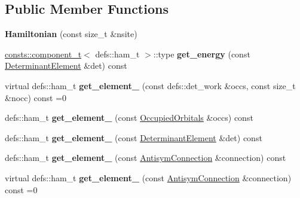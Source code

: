 \subsection*{Public Member Functions}
\begin{DoxyCompactItemize}
\item 
{\bfseries Hamiltonian} (const size\+\_\+t \&nsite)\hypertarget{classHamiltonian_aea9fe1aef1bf9bd4799a2b957c550f02}{}\label{classHamiltonian_aea9fe1aef1bf9bd4799a2b957c550f02}

\item 
\hyperlink{structconsts_1_1component__t}{consts\+::component\+\_\+t}$<$ defs\+::ham\+\_\+t $>$\+::type {\bfseries get\+\_\+energy} (const \hyperlink{classDeterminantElement}{Determinant\+Element} \&det) const \hypertarget{classHamiltonian_aed8eb6473b1540bdde9960a73393145e}{}\label{classHamiltonian_aed8eb6473b1540bdde9960a73393145e}

\item 
virtual defs\+::ham\+\_\+t {\bfseries get\+\_\+element\+\_} (const defs\+::det\+\_\+work \&occs, const size\+\_\+t \&nocc) const =0\hypertarget{classHamiltonian_a1042c841212b35ea08b0714942134dec}{}\label{classHamiltonian_a1042c841212b35ea08b0714942134dec}

\item 
defs\+::ham\+\_\+t {\bfseries get\+\_\+element\+\_} (const \hyperlink{structOccupiedOrbitals}{Occupied\+Orbitals} \&occs) const \hypertarget{classHamiltonian_a2e830dc13526070bc9b22033e11f100e}{}\label{classHamiltonian_a2e830dc13526070bc9b22033e11f100e}

\item 
defs\+::ham\+\_\+t {\bfseries get\+\_\+element\+\_} (const \hyperlink{classDeterminantElement}{Determinant\+Element} \&det) const \hypertarget{classHamiltonian_af24779f187d68cadd31c38e63e242c0e}{}\label{classHamiltonian_af24779f187d68cadd31c38e63e242c0e}

\item 
defs\+::ham\+\_\+t {\bfseries get\+\_\+element\+\_} (const \hyperlink{classAntisymConnection}{Antisym\+Connection} \&connection) const \hypertarget{classHamiltonian_a762f62b1bac356730f0a2e126f911d6e}{}\label{classHamiltonian_a762f62b1bac356730f0a2e126f911d6e}

\item 
virtual defs\+::ham\+\_\+t {\bfseries get\+\_\+element\+\_} (const \hyperlink{classAntisymConnection}{Antisym\+Connection} \&connection) const =0\hypertarget{classHamiltonian_aa1d2b517a085e7fb0488bc2874f075fe}{}\label{classHamiltonian_aa1d2b517a085e7fb0488bc2874f075fe}


\end{DoxyCompactItemize}
